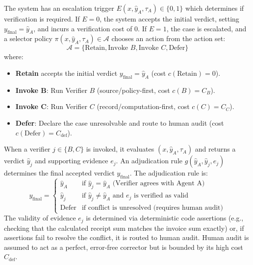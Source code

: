 \documentclass[manuscript,screen,nonacm]{acmart}
\begin{document}
The system has an escalation trigger $E(x, \hat{y}_A, \tau_A) \in \{0, 1\}$ which determines if verification is required. If $E=0$, the system accepts the initial verdict, setting $y_{\text{final}} = \hat{y}_A$, and incurs a verification cost of 0. If $E=1$, the case is escalated, and a selector policy $\pi(x, \hat{y}_A, \tau_A) \in \mathcal{A}$ chooses an action from the action set:
\begin{equation}
    \mathcal{A} = \{\text{Retain}, \text{Invoke } B, \text{Invoke } C, \text{Defer}\}
\end{equation}
where:
\begin{itemize}
    \item \textbf{Retain} accepts the initial verdict $y_{\text{final}} = \hat{y}_A$ (cost $c(\text{Retain}) = 0$).
    \item \textbf{Invoke B}: Run Verifier $B$ (source/policy-first, cost $c(B) = C_B$).
    \item \textbf{Invoke C}: Run Verifier $C$ (record/computation-first, cost $c(C) = C_C$).
    \item \textbf{Defer}: Declare the case unresolvable and route to human audit (cost $c(\text{Defer}) = C_{\text{def}}$).
\end{itemize}

When a verifier $j \in \{B, C\}$ is invoked, it evaluates $(x, \hat{y}_A, \tau_A)$ and returns a verdict $\hat{y}_j$ and supporting evidence $e_j$. An adjudication rule $g(\hat{y}_A, \hat{y}_j, e_j)$ determines the final accepted verdict $y_{\text{final}}$. The adjudication rule is:
\begin{equation}
    y_{\text{final}} = 
    \begin{cases} 
        \hat{y}_A & \text{if } \hat{y}_j = \hat{y}_A \text{ (Verifier agrees with Agent A)} \\
        \hat{y}_j & \text{if } \hat{y}_j \neq \hat{y}_A \text{ and } e_j \text{ is verified as valid} \\
        \text{Defer} & \text{if conflict is unresolved (requires human audit)}
    \end{cases}
\end{equation}
The validity of evidence $e_j$ is determined via deterministic code assertions (e.g., checking that the calculated receipt sum matches the invoice sum exactly) or, if assertions fail to resolve the conflict, it is routed to human audit. Human audit is assumed to act as a perfect, error-free corrector but is bounded by its high cost $C_{\text{def}}$.
\end{document}
